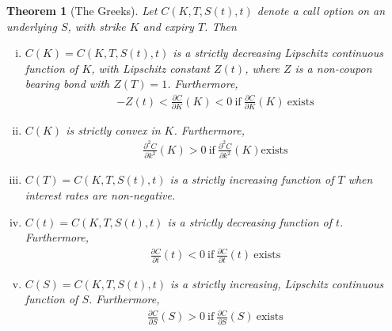 \documentclass[12pt]{article}
\newcommand{\p}{\partial}
\theoremstyle{plain}
\newtheorem{theorem}{Theorem}
\theoremstyle{definition}
\theoremstyle{remark}
\numberwithin{equation}{section}  %
\begin{document}
\begin{theorem}[The Greeks]
	Let $C(K, T, S(t), t)$ denote a call option on an underlying $S$, with 
	strike $K$ and expiry $T$. Then
	\begin{enumerate}[(i)]
		\item\label{itm:first} $C(K) = C(K, T, S(t), t)$ is a strictly decreasing Lipschitz continuous
			function of $K$, with Lipschitz constant $Z(t)$, where $Z$ is a non-coupon
			bearing bond with $Z(T) = 1$. Furthermore,
			\begin{equation*}
				\begin{split}
					-Z(t) < \frac{\p C}{\p K}(K) < 0 
					\ \text{if}\  \frac{\p C}{\p K}(K) \  \text{exists} 
				\end{split}
			\end{equation*}

		\item\label{itm:second} $C(K)$ is strictly convex in $K$. Furthermore,
			\begin{equation*}
				\begin{split}
					\frac{\p^{2} C}{\p
					k^{2}}(K) > 0 \ \text{if} \ \frac{\p^{2} C}{\p
					k^{2}}(K) \text{exists}
				\end{split}
			\end{equation*}
		\item\label{itm:third}
			$C(T) = C(K, T, S(t), t)$ is a strictly increasing function of
			$T$ when interest rates are non-negative.
		\item\label{itm:fourth}
			$C(t) = C(K, T, S(t), t)$ is a strictly decreasing function of
			$t$. Furthermore, 
			\begin{equation*}
				\begin{split}
					\frac{\p C}{\p t}(t) < 0 \ \text{if} 
					\  \frac{\p C}{\p t}(t) \ \text{exists}
				\end{split}
			\end{equation*}
		\item\label{itm:fifth}
			$C(S) = C(K, T, S(t), t)$ is a strictly increasing,
			Lipschitz continuous function of $S$. Furthermore,
			\begin{equation*}
				\begin{split}
					\frac{\p C}{\p S}(S) > 0 \ \text{if}
					\ \frac{\p C}{\p S}(S) \ \text{exists}
				\end{split}
			\end{equation*}
	\end{enumerate}
\end{theorem} 
\end{document}
